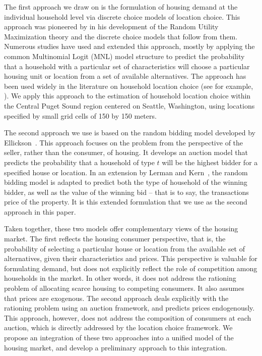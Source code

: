 \documentclass{article}
\begin{document}
The first approach we draw on is the formulation of housing demand at the
individual household level via discrete choice models of location choice. This approach
was pioneered by  in his development of the Random Utility Maximization
theory and the discrete choice models that follow from them.  Numerous studies have
used and extended this approach, mostly by applying the common Multinomial Logit (MNL)
model structure to predict the probability that a household with a particular set of
characteristics will choose a particular housing unit or location from a set of available
alternatives.  The approach has been used widely in the literature on household location
choice (see for example, \cite{Quigley1976,Waddell2000}).  We apply this approach to the estimation of household location choice within
the Central Puget Sound region centered on Seattle, Washington, using locations specified
by small grid cells of 150 by 150 meters.

The second approach we use is based on the random bidding model developed by
Ellickson~\citeyear{ellickson1977b}.  This approach focuses on the problem
from the perspective of the seller, rather than the consumer, of housing.  It
develops an auction model that predicts the probability that a household of type
$t$ will be the highest bidder for a specified house or location.  In an extension by
Lerman and Kern~\citeyear{Lerman1983}, the random bidding model is adapted to predict
both the type of household of the winning bidder, as well as the value of the winning
bid -- that is to say, the transactions price of the property.  It is this extended
formulation that we use as the second approach in this paper.

Taken together, these two models offer complementary views of the housing market.  The first
reflects the housing consumer perspective, that is, the probability of selecting a particular
house or location from the available set of alternatives, given their characteristics and prices.
This perspective is valuable for formulating demand, but does not explicitly reflect the role
of competition among households in the market.  In other words, it does not address the rationing
problem of allocating scarce housing to competing consumers.  It also assumes that prices are
exogenous.  The second approach deals explicitly with the rationing problem using an auction framework,
and predicts prices endogenously.  This approach, however, does not address the composition of
consumers at each auction, which is directly addressed by the location choice framework.  We propose
an integration of these two approaches into a unified model of the housing market, and develop
a preliminary approach to this integration.
\end{document}
